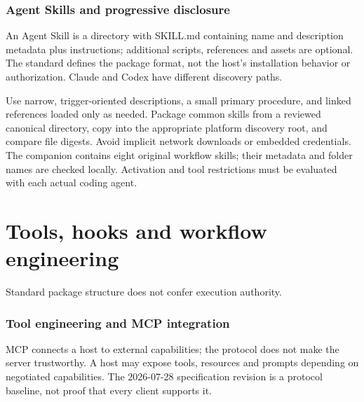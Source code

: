 \documentclass[11pt,letterpaper]{article}
\begin{document}
\section{Agent Skills and progressive disclosure}
An Agent Skill is a directory with SKILL.md containing name and description metadata plus instructions; additional scripts, references and assets are optional. The standard defines the package format, not the host's installation behavior or authorization. Claude and Codex have different discovery paths. \cite{spec,cskills,oskills}

Use narrow, trigger-oriented descriptions, a small primary procedure, and linked references loaded only as needed. Package common skills from a reviewed canonical directory, copy into the appropriate platform discovery root, and compare file digests. Avoid implicit network downloads or embedded credentials. The companion contains eight original workflow skills; their metadata and folder names are checked locally. Activation and tool restrictions must be evaluated with each actual coding agent.

\clearpage\part{Tools, hooks and workflow engineering}
\begin{center}\begin{minipage}{\linewidth}\captionsetup{type=figure}\centering{}\caption{Agent Skill architecture}
\small Standard package structure does not confer execution authority.\end{minipage}\end{center}
\section{Tool engineering and MCP integration}
MCP connects a host to external capabilities; the protocol does not make the server trustworthy. A host may expose tools, resources and prompts depending on negotiated capabilities. The 2026-07-28 specification revision is a protocol baseline, not proof that every client supports it. \cite{mcp,cmcp,omcp}
\end{document}
